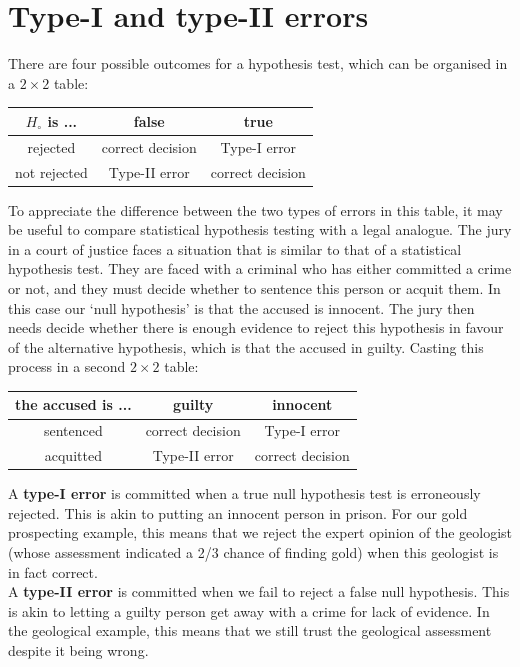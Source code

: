 \section{Type-I and type-II errors}
\label{sec:typeI&II}

There are four possible outcomes for a hypothesis test, which can be
organised in a ${2}\times{2}$ table:

\begin{center}
\begin{tabular}{c|cc}
  $H_\circ$ is ... & false & true \\ \hline
  rejected & correct decision & Type-I error \\
  not rejected & Type-II error & correct decision
\end{tabular}
\end{center}

To appreciate the difference between the two types of errors in this
table, it may be useful to compare statistical hypothesis testing with
a legal analogue. The jury in a court of justice faces a situation
that is similar to that of a statistical hypothesis test. They are
faced with a criminal who has either committed a crime or not, and
they must decide whether to sentence this person or acquit them.  In
this case our `null hypothesis' is that the accused is innocent.  The
jury then needs decide whether there is enough evidence to reject this
hypothesis in favour of the alternative hypothesis, which is that the
accused in guilty. Casting this process in a second ${2}\times{2}$
table:

\begin{center}
\begin{tabular}{c|cc}
  the accused is ... & guilty & innocent \\ \hline
  sentenced & correct decision & Type-I error \\
  acquitted & Type-II error & correct decision
\end{tabular}
\end{center}

A \textbf{type-I error} is committed when a true null hypothesis test
is erroneously rejected. This is akin to putting an innocent person in
prison. For our gold prospecting example, this means that we reject
the expert opinion of the geologist (whose assessment indicated a 2/3
chance of finding gold) when this geologist is in fact correct.\\

A \textbf{type-II error} is committed when we fail to reject a false
null hypothesis.  This is akin to letting a guilty person get away
with a crime for lack of evidence. In the geological example, this
means that we still trust the geological assessment despite it being
wrong.\\

